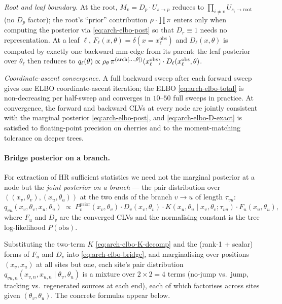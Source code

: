 \emph{Root and leaf boundary.} At the root, $M_v = D_p \cdot U_{s
\to p}$ reduces to $\prod_{i \neq v} U_{s_i \to \text{root}}$ (no
$D_p$ factor); the root's ``prior'' contribution $\rho \cdot \prod
\pi$ enters only when computing the posterior via \eqref{eq:arch-elbo-post}
so that $D_r \equiv 1$ needs no representation. At a leaf $\ell$,
$F_\ell(x, \theta) = \delta(x = x_\ell^{\mathrm{obs}})$ and
$D_\ell(x, \theta)$ is computed by exactly one backward mm-edge from
its parent; the leaf posterior over $\theta_\ell$ then reduces to
$q_\ell(\theta) \propto \rho_\theta \, \pi^{(\mathrm{arch}[\ldots, \theta])}(x_\ell^{\mathrm{obs}}) \cdot D_\ell(x_\ell^{\mathrm{obs}}, \theta)$.

\emph{Coordinate-ascent convergence.} A full backward sweep after each
forward sweep gives one ELBO coordinate-ascent iteration; the ELBO
\eqref{eq:arch-elbo-total} is non-decreasing per half-sweep and
converges in $10$--$50$ full sweeps in practice. At convergence, the forward and backward CLVs at
every node are jointly consistent with the marginal posterior
\eqref{eq:arch-elbo-post}, and \eqref{eq:arch-elbo-D-exact} is
satisfied to floating-point precision on cherries and to the
moment-matching tolerance on deeper trees.

\paragraph{Bridge posterior on a branch.}
\label{par:arch-phylo-elbo-bridge}

For extraction of HR sufficient statistics we need not the marginal
posterior at a node but the \emph{joint posterior on a branch} ---
the pair distribution over $((x_v, \theta_v), (x_u, \theta_u))$ at
the two ends of the branch $v \to u$ of length $\tau_{vu}$:
\begin{equation}
q_{vu}(x_v, \theta_v, x_u, \theta_u)
    \;\propto\;
    P^{\mathrm{prior}}_v(x_v, \theta_v) \cdot D_v(x_v, \theta_v)
    \cdot K(x_u, \theta_u \mid x_v, \theta_v; \tau_{vu})
    \cdot F_u(x_u, \theta_u),
    \label{eq:arch-elbo-bridge}
\end{equation}
where $F_u$ and $D_v$ are the converged CLVs and the normalising
constant is the tree log-likelihood $P(\text{obs})$.

Substituting the two-term $K$ \eqref{eq:arch-elbo-K-decomp} and the
(rank-1 + scalar) forms of $F_u$ and $D_v$ into
\eqref{eq:arch-elbo-bridge}, and marginalising over positions
$(x_v, x_u)$ at all sites but one, each site's pair distribution
$q_{vu, n}(x_{v, n}, x_{u, n} \mid \theta_v, \theta_u)$ is a mixture
over $2 \times 2 = 4$ terms (no-jump vs.\ jump, tracking vs.\ regenerated
sources at each end), each of which factorises across sites given
$(\theta_v, \theta_u)$. The concrete formulas appear below.

